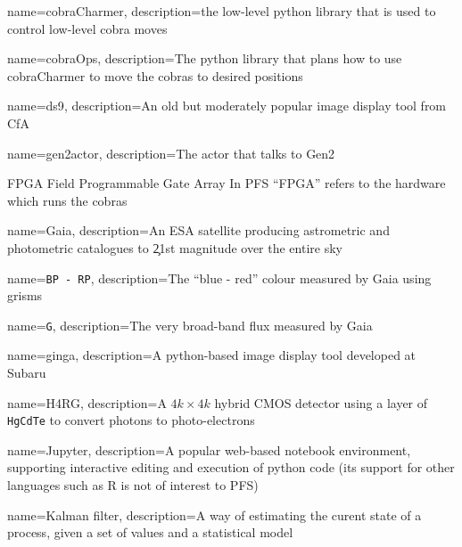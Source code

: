 %
%
%
%
%
{
  name={cobraCharmer},
  description={the low-level python library that is used to control low-level cobra moves}
}

{
  name={cobraOps},
  description={The python library that plans how to use \gls{cobraCharmer} to move
  the cobras to desired positions}
}

{
  name={ds9},
  description={An old but moderately popular image display tool from CfA}
}

{
  name={gen2actor},
  description={The \MHS actor that talks to \gls{Gen2}}
}

{FPGA}
{Field Programmable Gate Array}
{In PFS ``FPGA'' refers to the hardware which runs the cobras}


{
  name={Gaia},
  description={An ESA satellite producing astrometric and photometric catalogues to \c 21st
  magnitude over the entire sky}
}

{
  name={\texttt{BP - RP}},
  description={The ``blue - red'' colour measured by \gls{Gaia} using grisms}
}

{
  name={\texttt{G}},
  description={The very broad-band flux measured by \gls{Gaia}}
}

{
  name={ginga},
  description={A python-based image display tool developed at Subaru}
}

{
   name={H4RG},
   description={A $4k\times 4k$ hybrid CMOS detector using a layer of \texttt{HgCdTe} to convert photons
   to photo-electrons}
}

{
  name={Jupyter},
  description={A popular web-based notebook environment, supporting interactive editing
    and execution of python code (its support for other languages such as R is not of interest to PFS)}
}

{
   name={Kalman filter},
   description={A way of estimating the curent state of a process, given a set of values and
   a statistical model}
}

